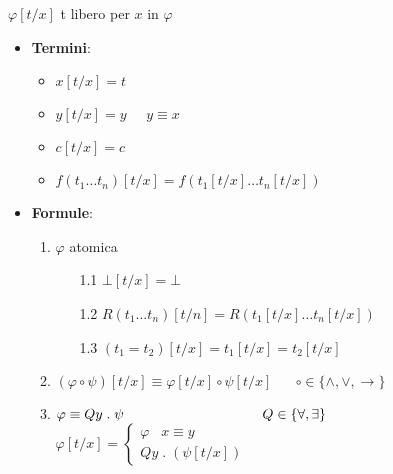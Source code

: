 \documentclass{article}
\theoremstyle{break}
\theoremstyle{break}
\theoremstyle{break}
\theoremstyle{break}
\begin{document}
\begin{figure}[H]
  \begin{definition}[Sostituzione]
    \( \varphi[t/x] \) t libero per \( x \) in \( \varphi \) 
    \begin{itemize}
      \item \textbf{Termini}:
        \begin{itemize}
          \item 
            \(
            x[t/x] = t
            \) 
          \item 
            \(
            y[t/x] = y\;\;\;\;\; y \equiv x
            \) 
          \item 
            \(
            c[t/x] = c
            \) 
          \item 
            \(
            f(t_1 \ldots t_n)[t/x] = f(t_1[t/x] \ldots t_n[t/x])
            \) 
        \end{itemize}
      \item \textbf{Formule}:
        \begin{enumerate}
          \item \( \varphi \) atomica
            \begin{enumerate}
              \item[1.1] \(
              \bot[t/x] = \bot
              \) 
            \item[1.2]
              \( R(t_1 \ldots t_n)[t/n] = R(t_1[t/x] \ldots t_n[t/x]) \) 
            \item [1.3]
              \( (t_1 = t_2)[t/x] = t_1[t/x] = t_2[t/x] \)
            \end{enumerate}
          \item \( (\varphi \circ \psi)[t/x] \equiv \varphi[t/x] \circ \psi[t/x] \;\;\;\;\;\; \circ \in \{\wedge, \vee, \to \} \)
          \item \( \varphi \equiv Qy\;.\;\psi \hspace{3.5cm} Q \in \{\forall , \exists \}  \) \\
                \(
                  \varphi[t/x] = \begin{cases}
                    \varphi\;\;\; x \equiv y\\
                    Qy\;.\;(\psi[t/x])
                  \end{cases}
                \) 
        \end{enumerate}
    \end{itemize}
  \end{definition}
\end{figure}
\end{document}

